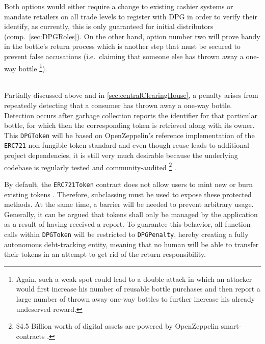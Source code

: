 \begin{description}[format={\storedescriptionlabel}]
	Both options would either require a change to existing cashier systems or mandate retailers on all trade levels to register with \ac{DPG} in order to verify their identify, as currently, this is only guaranteed for initial distributors (comp.~\ref{sec:DPGRoles}). On the other hand, option number two will prove handy in the bottle's return process which is another step that must be secured to prevent false accusations (i.e.~claiming that someone else has thrown away a one-way bottle \footnote{Again, such a weak spot could lead to a double attack in which an attacker would first increase his number of reusable bottle purchases and then report a large number of thrown away one-way bottles to further increase his already undeserved reward.}).
	\item[Penalty]
	\hfill \\
	Partially discussed above and in \autoref{sec:centralClearingHouse}, a penalty arises from repeatedly detecting that a consumer has thrown away a one-way bottle. Detection occurs after garbage collection reports the identifier for that particular bottle, for which then the corresponding token is retrieved along with its owner. This \texttt{DPGToken} will be based on OpenZeppelin's reference implementation of the \texttt{ERC721} non-fungible token standard and even though reuse leads to additional project dependencies, it is still very much desirable because the underlying codebase is regularly tested and community-audited \footnote{\$4.5 Billion worth of digital assets are powered by OpenZeppelin smart-contracts \cite{openZeppelin}.} \cite{openZeppelinGitHub}. 
	
	By default, the \texttt{ERC721Token} contract does not allow users to mint new or burn existing tokens \cite{}. Therefore, subclassing must be used to expose these protected methods. At the same time, a barrier will be needed to prevent arbitrary usage. Generally, it can be argued that tokens shall only be managed by the application as a result of having received a report. To guarantee this behavior, all function calls within \texttt{DPGToken} will be restricted to \texttt{DPGPenalty}, hereby creating a fully autonomous debt-tracking entity, meaning that no human will be able to transfer their tokens in an attempt to get rid of the return responsibility.
	

\end{description}
